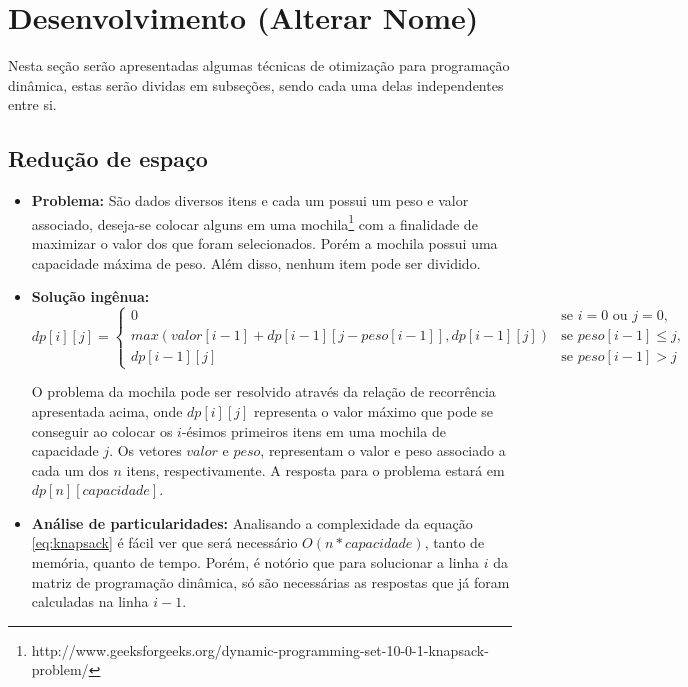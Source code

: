 \chapter{Desenvolvimento (Alterar Nome) }
\label{chap:desenvolvimento}

Nesta seção serão apresentadas algumas técnicas de otimização para programação dinâmica, estas serão dividas em subseções, sendo cada uma delas independentes entre si.

\section{Redução de espaço}

\begin{itemize}
\item \textbf{Problema:}
 São dados diversos itens e cada um possui um peso e valor associado, deseja-se colocar alguns em uma mochila\footnote{http://www.geeksforgeeks.org/dynamic-programming-set-10-0-1-knapsack-problem/} com a finalidade de maximizar o valor dos que foram selecionados. Porém a mochila possui uma capacidade máxima de peso. Além disso, nenhum item pode ser dividido.
 \\
\item \textbf{Solução ingênua:} 
\begin{equation}
dp[i][j] = 
\begin{cases}
0 &\text{se } i = 0 \text{ ou } j = 0,\\
max(valor[i-1] + dp[i-1][j-peso[i-1]], dp[i-1][j]) &\text{se } peso[i-1] \leq{j},\\
dp[i-1][j] &\text{se } peso[i-1] > j
\end{cases}
\label{eq:knapsack}
\end{equation}

O problema da mochila pode ser resolvido através da relação de recorrência apresentada acima, onde $dp[i][j]$ representa o valor máximo que pode se conseguir ao colocar os $i$-ésimos primeiros itens em uma mochila de capacidade $j$. Os vetores $valor$ e $peso$, representam o valor e peso associado a cada um dos $n$ itens, respectivamente. A resposta para o problema estará em $dp[n][capacidade]$.


\item \textbf{Análise de particularidades:}
Analisando a complexidade da equação \ref{eq:knapsack} é fácil ver que será necessário $O(n*capacidade)$, tanto de memória, quanto de tempo. Porém, é notório que para solucionar a linha $i$ da matriz de programação dinâmica, só são necessárias as respostas que já foram calculadas na linha $i - 1$.



\end{itemize}
